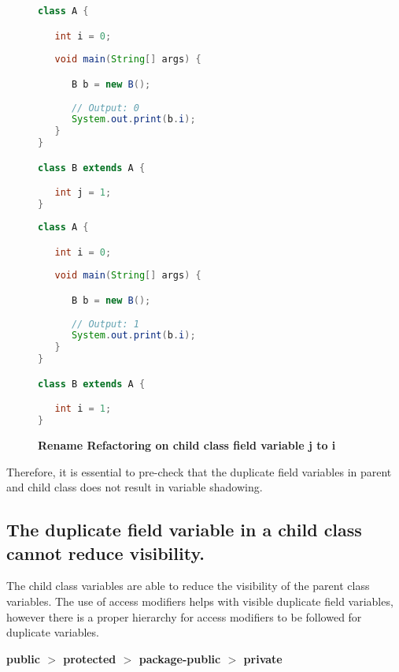 \begin{figure}[th]
\centering
\begin{minipage}[t]{0.47\linewidth}
\begin{lstlisting}[language=java, basicstyle=\scriptsize\ttfamily,frame=single]
class A {

   int i = 0;
   
   void main(String[] args) {

      B b = new B();
	      
      // Output: 0
      System.out.print(b.i); 
   }
}

class B extends A {

   int j = 1; 
}
\end{lstlisting}
\end{minipage}
\hfill
\begin{minipage}[t]{0.47\linewidth}
\begin{lstlisting}[language=java, basicstyle=\scriptsize\ttfamily,frame=single]
class A {

   int i = 0;
   
   void main(String[] args) {

      B b = new B();
	      
      // Output: 1
      System.out.print(b.i); 
   }
}

class B extends A {

   int i = 1; 
}
\end{lstlisting}
\end{minipage}
\caption{\textbf{Rename Refactoring on child class field variable j to i}}
\label{figure:classEx}
\end{figure}

Therefore, it is essential to pre-check that the duplicate field variables in parent and child class does not result in variable shadowing. 

\subsection{The duplicate field variable in a child class cannot reduce visibility.}

The child class variables are able to reduce the visibility of the parent class variables. The use of access modifiers helps with visible duplicate field variables, however there is a proper hierarchy for access modifiers to be followed for duplicate variables.


\begin{center}
\textbf{public $>$ protected $>$ package-public $>$ private}
\end{center}


